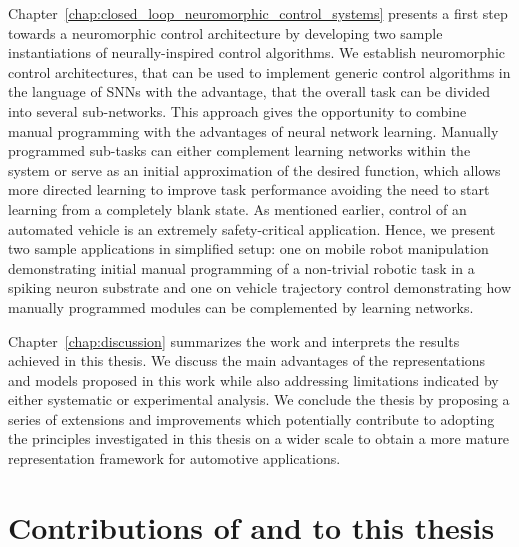Chapter~\ref{chap:closed_loop_neuromorphic_control_systems} presents a first step towards a neuromorphic control architecture by developing two sample instantiations of neurally-inspired control algorithms.
We establish neuromorphic control architectures, that can be used to implement generic control algorithms in the language of \acp{SNN} with the advantage, that the overall task can be divided into several sub-networks.
This approach gives the opportunity to combine manual programming with the advantages of neural network learning.
Manually programmed sub-tasks can either complement learning networks within the system or serve as an initial approximation of the desired function, which allows more directed learning to improve task performance avoiding the need to start learning from a completely blank state.
As mentioned earlier, control of an automated vehicle is an extremely safety-critical application.
Hence, we present two sample applications in simplified setup: one on mobile robot manipulation demonstrating initial manual programming of a non-trivial robotic task in a spiking neuron substrate and one on vehicle trajectory control demonstrating how manually programmed modules can be complemented by learning networks.

Chapter~\ref{chap:discussion} summarizes the work and interprets the results achieved in this thesis.
We discuss the main advantages of the representations and models proposed in this work while also addressing limitations indicated by either systematic or experimental analysis.
We conclude the thesis by proposing a series of extensions and improvements which potentially contribute to adopting the principles investigated in this thesis on a wider scale to obtain a more mature representation framework for automotive applications.

\section{Contributions of and to this thesis}%
\label{sec:contributions_of_and_to_this_thesis}

